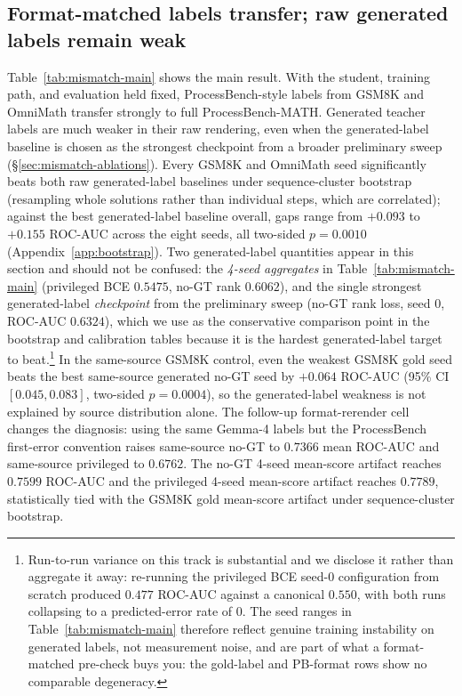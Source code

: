 \documentclass{article}
\begin{document}
\subsection{Format-matched labels transfer; raw generated labels remain weak}
\label{sec:mismatch-main}
Table~\ref{tab:mismatch-main} shows the main result. With the student,
training path, and evaluation held fixed, ProcessBench-style labels from
GSM8K and OmniMath transfer strongly to full ProcessBench-MATH. Generated
teacher labels are much weaker in their raw rendering, even when the generated-label baseline is
chosen as the strongest checkpoint from a broader preliminary sweep
(\S\ref{sec:mismatch-ablations}). Every GSM8K and OmniMath seed
significantly beats both raw generated-label baselines under sequence-cluster
bootstrap (resampling whole solutions rather than individual steps, which
are correlated); against the best generated-label baseline overall, gaps
range from $+0.093$ to $+0.155$ ROC-AUC across the eight seeds, all
two-sided $p = 0.0010$ (Appendix~\ref{app:bootstrap}). Two generated-label
quantities appear in this section and should not be confused: the
\emph{4-seed aggregates} in Table~\ref{tab:mismatch-main} (privileged BCE
$0.5475$, no-GT rank $0.6062$), and the single strongest generated-label
\emph{checkpoint} from the preliminary sweep (no-GT rank loss, seed 0, ROC-AUC
$0.6324$), which we use as the conservative comparison point in the bootstrap
and calibration tables because it is the hardest generated-label target to
beat.\footnote{Run-to-run variance on this track is substantial and we disclose
it rather than aggregate it away: re-running the privileged BCE seed-0
configuration from scratch produced $0.477$ ROC-AUC against a canonical
$0.550$, with both runs collapsing to a predicted-error rate of $0$. The
seed ranges in Table~\ref{tab:mismatch-main} therefore reflect genuine
training instability on generated labels, not measurement noise, and are part
of what a format-matched pre-check buys you: the gold-label and PB-format rows
show no comparable degeneracy.}
In the same-source GSM8K control, even the weakest GSM8K gold seed beats the
best same-source generated no-GT seed by $+0.064$ ROC-AUC (95\% CI
$[0.045,0.083]$, two-sided $p=0.0004$), so the generated-label weakness is
not explained by source distribution alone.
The follow-up format-rerender cell changes the diagnosis: using the same
Gemma-4 labels but the ProcessBench first-error convention raises same-source
no-GT to $0.7366$ mean ROC-AUC and same-source privileged to $0.6762$.
The no-GT 4-seed mean-score artifact reaches $0.7599$ ROC-AUC and the
privileged 4-seed mean-score artifact reaches $0.7789$, statistically tied
with the GSM8K gold mean-score artifact under sequence-cluster bootstrap.
\end{document}

